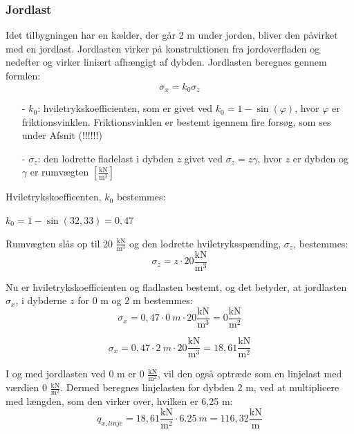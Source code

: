 \subsubsection{Jordlast}
Idet tilbygningen har en kælder, der går 2 m under jorden, bliver den påvirket med en jordlast. Jordlasten virker på konstruktionen fra jordoverfladen og nedefter og virker liniært afhængigt af dybden.
\newline
\newline
Jordlasten beregnes gennem formlen:
\begin{equation}
	\sigma_x = k_0 \sigma_z
\end{equation}

\begin{itemize}
	\item[-] $k_0$: hviletrykskoefficienten, som er givet ved $k_0=1-\sin(\varphi)$, hvor $\varphi$ er friktionsvinklen. Friktionsvinklen er bestemt igennem fire forsøg, som ses under Afsnit (!!!!!!)
	\item[-] $\sigma_z$: den lodrette fladelast i dybden $z$ givet ved $\sigma_z = z\gamma$, hvor $z$ er dybden og $\gamma$ er rumvægten $[\frac{\text{kN}}{\text{m}^3}]$
\end{itemize}

Hviletrykskoefficenten, $k_0$ bestemmes:
\begin{center}
	$k_0 = 1 - \sin(32,\!33) = 0,\!47$
\end{center}

Rumvægten slås op til 20 $\frac{\text{kN}}{\text{m}^3}$ \citep[ s. 386]{stabi} og den lodrette hviletryksspænding, $\sigma_z$, bestemmes:
\begin{equation}
	\sigma_z = z\cdot 20 \frac{\text{kN}}{\text{m}^3}
\end{equation}

Nu er hviletrykskoefficienten og fladlasten bestemt, og det betyder, at jordlasten $\sigma_x$, i dybderne $z$ for 0 m og 2 m bestemmes:
\begin{equation}
	\sigma_x = 0,\!47\cdot \SI{0}{m}\cdot 20 \frac{\text{kN}}{\text{m}^3} = 0 \frac{\text{kN}}{\text{m}^2}
\end{equation}

\begin{equation}
	\sigma_x = 0,\!47\cdot \SI{2}{m}\cdot 20 \frac{\text{kN}}{\text{m}^3} = 18,\!61 \frac{\text{kN}}{\text{m}^2}
\end{equation}

I og med jordlasten ved 0 m er 0 $\frac{\text{kN}}{\text{m}^2}$, vil den også optræde som en linjelast med værdien 0 $\frac{\text{kN}}{\text{m}^2}$. Dermed beregnes linjelasten for dybden 2 m, ved at multiplicere med længden, som den virker over, hvilken er 6,25 m:
\begin{equation}
	q_{x,linje} = 18,\!61 \frac{\text{kN}}{\text{m}^2}\cdot \SI{6,25}{m} = 116,\!32 \frac{\text{kN}}{\text{m}}
\end{equation}


